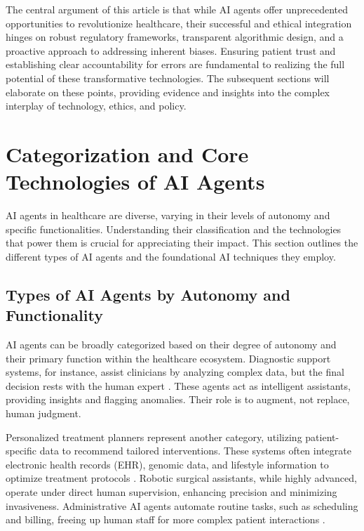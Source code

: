 \documentclass[12pt,a4paper]{article}
\begin{document}
The central argument of this article is that while AI agents offer unprecedented opportunities to revolutionize healthcare, their successful and ethical integration hinges on robust regulatory frameworks, transparent algorithmic design, and a proactive approach to addressing inherent biases. Ensuring patient trust and establishing clear accountability for errors are fundamental to realizing the full potential of these transformative technologies. The subsequent sections will elaborate on these points, providing evidence and insights into the complex interplay of technology, ethics, and policy.

\section{Categorization and Core Technologies of AI Agents}
\label{sec:categorization}
AI agents in healthcare are diverse, varying in their levels of autonomy and specific functionalities. Understanding their classification and the technologies that power them is crucial for appreciating their impact. This section outlines the different types of AI agents and the foundational AI techniques they employ.

\subsection{Types of AI Agents by Autonomy and Functionality}
\label{sec:agent_types}
AI agents can be broadly categorized based on their degree of autonomy and their primary function within the healthcare ecosystem. Diagnostic support systems, for instance, assist clinicians by analyzing complex data, but the final decision rests with the human expert \cite{topol2019highperformance}. These agents act as intelligent assistants, providing insights and flagging anomalies. Their role is to augment, not replace, human judgment.

Personalized treatment planners represent another category, utilizing patient-specific data to recommend tailored interventions. These systems often integrate electronic health records (EHR), genomic data, and lifestyle information to optimize treatment protocols \cite{davenport2019ai}. Robotic surgical assistants, while highly advanced, operate under direct human supervision, enhancing precision and minimizing invasiveness. Administrative AI agents automate routine tasks, such as scheduling and billing, freeing up human staff for more complex patient interactions \cite{salesforce.com}.
\end{document}
